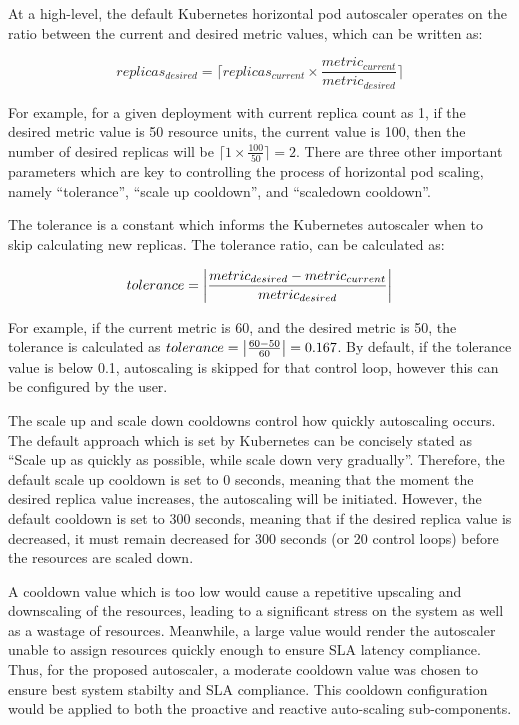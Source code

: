 At a high-level, the default Kubernetes horizontal pod autoscaler operates on the ratio between the current and desired metric values, which can be written as:

\begin{equation}
    replicas_{desired} = \lceil replicas_{current} \times \frac{metric_{current}}{metric_{desired}}\rceil
\end{equation}

For example, for a given deployment with current replica count as 1, if the desired metric value is 50 resource units, the current value is 100, then the number of desired replicas will be $\lceil 1 \times \frac{100}{50}\rceil = 2$. There are three other important parameters which are key to controlling the process of horizontal pod scaling, namely ``tolerance'', ``scale up cooldown'', and ``scaledown cooldown''.\par

The tolerance is a constant which informs the Kubernetes autoscaler when to skip calculating new replicas. The tolerance ratio, can be calculated as:

\begin{equation}
    \label{eqn:tolerance}
    tolerance = \abs{ \frac{metric_{desired} - metric_{current}}{metric_{desired}} }
\end{equation}

For example, if the current metric is 60, and the desired metric is 50, the tolerance is calculated as $ tolerance = \abs{ \frac{60 - 50}{60}} = 0.167$. By default, if the tolerance value is below 0.1, autoscaling is skipped for that control loop, however this can be configured by the user.\par

The scale up and scale down cooldowns control how quickly autoscaling occurs. The default approach which is set by Kubernetes can be concisely stated as ``Scale up as quickly as possible, while scale down very gradually''. Therefore, the default scale up cooldown is set to 0 seconds, meaning that the moment the desired replica value increases, the autoscaling will be initiated. However, the default cooldown is set to 300 seconds, meaning that if the desired replica value is decreased, it must remain decreased for 300 seconds (or 20 control loops) before the resources are scaled down.\par

A cooldown value which is too low would cause a repetitive upscaling and downscaling of the resources, leading to a significant stress on the system as well as a wastage of resources. Meanwhile, a large value would render the autoscaler unable to assign resources quickly enough to ensure SLA latency compliance. Thus, for the proposed autoscaler, a moderate cooldown value was chosen to ensure best system stabilty and SLA compliance. This cooldown configuration would be applied to both the proactive and reactive auto-scaling sub-components.\par

